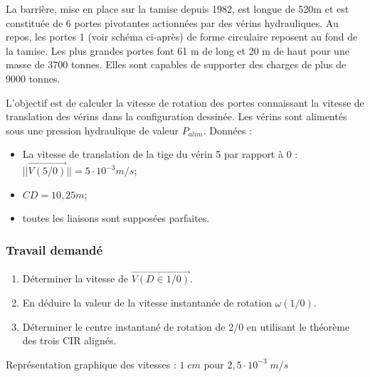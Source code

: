 La barrière, mise en place sur la tamise depuis 1982, est longue de 520m et est constituée de
6 portes pivotantes actionnées par des vérins hydrauliques. Au repos, les portes 1 (voir schéma ci-après)
de forme circulaire reposent au fond de la tamise. Les plus grandes portes font 61 m de long
et 20 m de haut pour une masse de 3700 tonnes. Elles sont capables de supporter des charges de
plus de 9000 tonnes.

L'objectif est de calculer la vitesse de rotation des portes connaissant la vitesse de translation des
vérins dans la configuration dessinée. Les vérins sont alimentés sous une pression hydraulique de
valeur $P_{alim}$.
Données :
\begin{itemize}
\item La vitesse de translation de la tige du vérin 5 par rapport à 0 : $||\overrightarrow{V(5/0)}||=5\cdot10^{-3} m/s$;
\item $CD=10,25m$;
\item toutes les liaisons sont supposées parfaites.
\end{itemize}

\subsubsection{Travail demandé}
\begin{enumerate}
\item Déterminer la vitesse de $\overrightarrow{V(D \in 1/ 0)}$.
\item En déduire la valeur de la vitesse instantanée de rotation $\omega(1/0)$.
\item Déterminer le centre instantané de rotation de 2/0 en utilisant le théorème des trois
CIR alignés.
\end{enumerate}
\vspace{3cm}
Représentation graphique des vitesses : $1 \; cm$ pour $2,5\cdot10^{-3} \; m/s$

